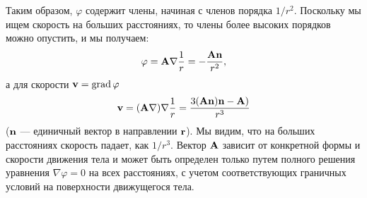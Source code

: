 Таким образом, $\varphi$ содержит члены, начиная с членов порядка $1/r^2$.
Поскольку мы ищем скорость на больших расстояниях, то члены более высоких
порядков можно опустить, и мы получаем:
\begin{equation}
   \label{eq:11.1}
   \varphi = \mathbf{A} \nabla \frac1{r} = - \frac{\mathbf{An}}{r^2},
\end{equation}
а для скорости $\mathbf{v} = \mathop{\mathrm{grad}}\nolimits \varphi$
\begin{equation}
   \label{eq:11.2}
   \mathbf{v} = (\mathbf{A} \nabla) \nabla \frac1{r} = \frac{3\mathbf{(An)n - A})}{r^3}
\end{equation}
($\mathbf{n}$ — единичный вектор в направлении $\mathbf{r}$). Мы видим, что на больших
расстояниях скорость падает, как $1/r^3$. Вектор $\mathbf{A}$ зависит от конкретной
формы и скорости движения тела и может быть определен только путем полного
решения уравнения $\nabla \varphi = 0$ на всех расстояниях, с учетом
соответствующих граничных условий на поверхности движущегося тела.

